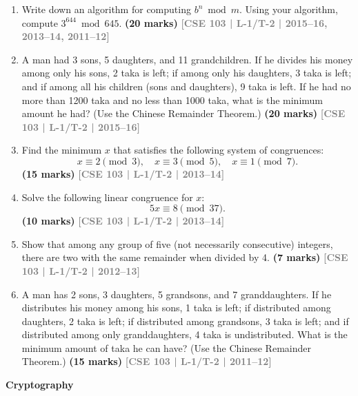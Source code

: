 \documentclass[12pt,a3paper]{article}
\newcommand{\yr}[1]{\hfill\textcolor{gray}{\small\textbf{[#1]}}}
\newcommand{\mk}[1]{\textcolor{orange!70!black}{\small\textbf{(#1 marks)}}}
\newcommand{\subtopic}[2]{%
  \vspace{10pt}
  \noindent\begin{tcolorbox}[colback=#1!8,colframe=#1,boxrule=0.6pt,arc=4pt,
    left=6pt,right=6pt,top=4pt,bottom=4pt]
    \small\bfseries\textcolor{#1}{#2}
  \end{tcolorbox}
  \vspace{2pt}
}
\begin{document}
\begin{enumerate}

\item Write down an algorithm for computing $b^n \bmod m$. Using your algorithm, compute $3^{644} \bmod 645$.
\mk{20} \yr{CSE 103 | L-1/T-2 | 2015--16, 2013--14, 2011--12}

\item A man had 3 sons, 5 daughters, and 11 grandchildren. If he divides his money among only his sons, 2 taka is left; if among only his daughters, 3 taka is left; and if among all his children (sons and daughters), 9 taka is left. If he had no more than 1200 taka and no less than 1000 taka, what is the minimum amount he had? (Use the Chinese Remainder Theorem.)
\mk{20} \yr{CSE 103 | L-1/T-2 | 2015--16}  



\item Find the minimum $x$ that satisfies the following system of congruences:
\[
  x \equiv 2 \pmod{3}, \quad x \equiv 3 \pmod{5}, \quad x \equiv 1 \pmod{7}.
\]
\mk{15} \yr{CSE 103 | L-1/T-2 | 2013--14}



\item Solve the following linear congruence for $x$:
\[
  5x \equiv 8 \pmod{37}.
\]
\mk{10} \yr{CSE 103 | L-1/T-2 | 2013--14}


\item Show that among any group of five (not necessarily consecutive) integers, there are two with the same remainder when divided by 4.
\mk{7} \yr{CSE 103 | L-1/T-2 | 2012--13}



\item A man has 2 sons, 3 daughters, 5 grandsons, and 7 granddaughters. If he distributes his money among his sons, 1 taka is left; if distributed among daughters, 2 taka is left; if distributed among grandsons, 3 taka is left; and if distributed among only granddaughters, 4 taka is undistributed. What is the minimum amount of taka he can have? (Use the Chinese Remainder Theorem.)
\mk{15} \yr{CSE 103 | L-1/T-2 | 2011--12}



\end{enumerate}

\subtopic{cC}{Cryptography}
\label{sub:s5-cryptograpy}
\end{document}
